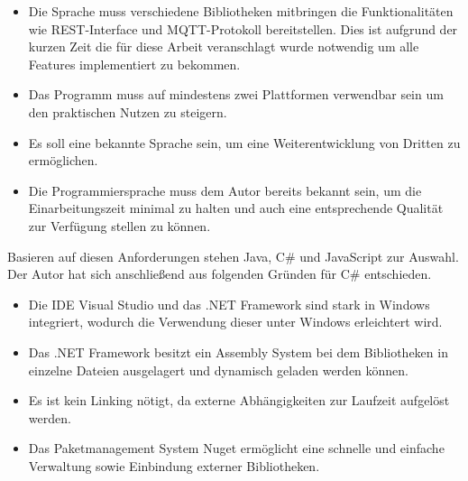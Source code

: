     \begin{itemize}
        \item Die Sprache muss verschiedene Bibliotheken mitbringen die Funktionalitäten wie REST-Interface und \ac{MQTT}-Protokoll bereitstellen. Dies ist aufgrund der kurzen Zeit die für diese Arbeit veranschlagt wurde notwendig um alle Features implementiert zu bekommen.
        \item Das Programm muss auf mindestens zwei Plattformen verwendbar sein um den praktischen Nutzen zu steigern.
        \item Es soll eine bekannte Sprache sein, um eine Weiterentwicklung von Dritten zu ermöglichen.
        \item Die Programmiersprache muss dem Autor bereits bekannt sein, um die Einarbeitungszeit minimal zu halten und auch eine entsprechende Qualität zur Verfügung stellen zu können.
    \end{itemize}
    Basieren auf diesen Anforderungen stehen Java, C\# und JavaScript zur Auswahl.
    Der Autor hat sich anschließend aus folgenden Gründen für C\# entschieden.
    \begin{itemize}
        \item Die \ac{IDE} Visual Studio und das .NET Framework sind stark in Windows integriert, wodurch die Verwendung dieser unter Windows erleichtert wird.
        \item Das .NET Framework besitzt ein Assembly System bei dem Bibliotheken in einzelne Dateien ausgelagert und dynamisch geladen werden können.
        \item Es ist kein Linking nötigt, da externe Abhängigkeiten zur Laufzeit aufgelöst werden.
        \item Das Paketmanagement System Nuget ermöglicht eine schnelle und einfache Verwaltung sowie Einbindung externer Bibliotheken.
    \end{itemize}
    

